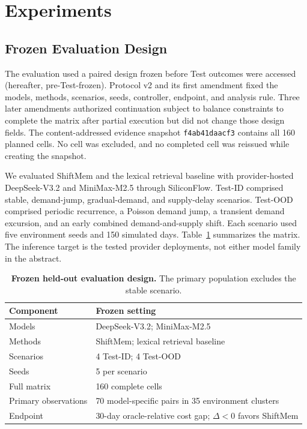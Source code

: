 \section{Experiments}
\label{sec:experiments}

\subsection{Frozen Evaluation Design}
\label{sec:experimental-design}

The evaluation used a paired design frozen before Test outcomes were accessed
(hereafter, pre-Test-frozen). Protocol v2 and its first amendment fixed the
models, methods, scenarios, seeds, controller, endpoint, and analysis rule.
Three later amendments authorized continuation subject to balance constraints to
complete the matrix after partial execution but did not change those design
fields. The
content-addressed evidence snapshot \texttt{f4ab41daacf3} contains all 160
planned cells. No cell was excluded, and no completed cell was reissued while
creating the snapshot.

We evaluated ShiftMem and the lexical retrieval baseline with provider-hosted
DeepSeek-V3.2 and MiniMax-M2.5 through SiliconFlow. Test-ID comprised stable,
demand-jump, gradual-demand, and supply-delay scenarios. Test-OOD comprised
periodic recurrence, a Poisson demand jump, a transient demand excursion, and an
early combined demand-and-supply shift. Each scenario used five environment
seeds and 150 simulated days. Table~\ref{tab:frozen-design} summarizes the
matrix. The inference target is the tested provider deployments, not either
model family in the abstract.

\begin{table}[t]
  \caption{\textbf{Frozen held-out evaluation design.} The primary population
  excludes the stable scenario.}
  \label{tab:frozen-design}
  \centering
  \small
  \setlength{\tabcolsep}{3pt}
  \renewcommand{\arraystretch}{1.08}
  \begin{tabular}{@{}p{}p{}@{}}
    \toprule
    Component & Frozen setting \\
    \midrule
    Models & DeepSeek-V3.2; MiniMax-M2.5 \\
    Methods & ShiftMem; lexical retrieval baseline \\
    Scenarios & 4 Test-ID; 4 Test-OOD \\
    Seeds & 5 per scenario \\
    Full matrix & 160 complete cells \\
    Primary observations & 70 model-specific pairs in 35 environment clusters \\
    Endpoint & 30-day oracle-relative cost gap; $\Delta<0$ favors ShiftMem \\
    \bottomrule
  \end{tabular}
\end{table}


